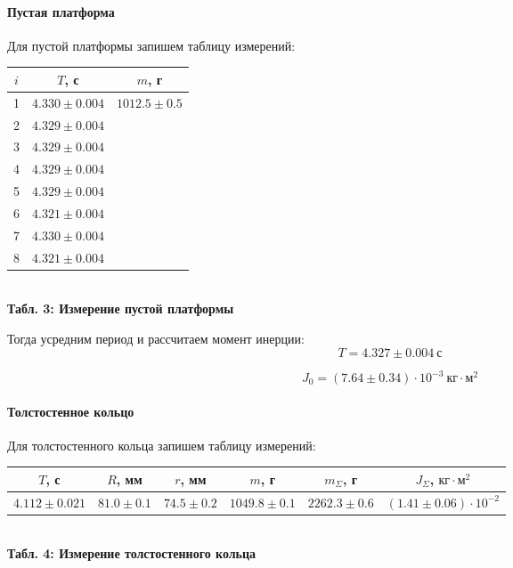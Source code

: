 \documentclass[12pt,a4paper]{scrartcl}
\begin{document}
	\paragraph{Пустая платформа} \hfill
	
	\par Для пустой платформы запишем таблицу измерений:
	
	\begin{center}
		\begin{tabular}{|c|c|c|}
			\hline
			$i$ & $T$, с & $m$, г
			\\\hline
			1 & $4.330 \pm 0.004$ & \multirow{8}{*}{$1012.5 \pm 0.5$}
			\\\cline{1-2}
			2 & $4.329 \pm 0.004$ &
			\\\cline{1-2}
			3 & $4.329 \pm 0.004$ &
			\\\cline{1-2}
			4 & $4.329 \pm 0.004$ &
			\\\cline{1-2}
			5 & $4.329 \pm 0.004$ &
			\\\cline{1-2}
			6 & $4.321 \pm 0.004$ &
			\\\cline{1-2}
			7 & $4.330 \pm 0.004$ &
			\\\cline{1-2}
			8 & $4.321 \pm 0.004$ &
			\\\hline
		\end{tabular}
		\\\textbf{Табл. 3: Измерение пустой платформы}
	\end{center}

	Тогда усредним период и рассчитаем момент инерции:
	$$T = 4.327 \pm 0.004\ \text{с}$$
	
	$$J_0 = (7.64 \pm 0.34) \cdot 10^{-3}\ \text{кг}\cdot\text{м}^2$$
	
	\paragraph{Толстостенное кольцо} \hfill
	
	Для толстостенного кольца запишем таблицу измерений:
	
	\begin{center}
		\begin{tabular}{|c|c|c|c|c|c|}
			\hline
			$T$, с & $R$, мм & $r$, мм & $m$, г & $m_{\Sigma}$, г & $J_\Sigma$, $\text{кг}\cdot\text{м}^2$
			\\\hline
			$4.112 \pm 0.021$ & $81.0 \pm 0.1$ & $74.5 \pm 0.2$ & $1049.8 \pm 0.1$ & $2262.3 \pm 0.6$ & $(1.41 \pm 0.06) \cdot 10^{-2}$
			\\\hline
		\end{tabular}
		\\\textbf{Табл. 4: Измерение толстостенного кольца}
	\end{center}
\end{document}
